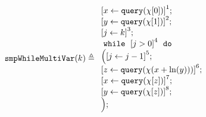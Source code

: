 %
                    \begin{example}
                        \[
                        \kw{smpWhileMultiVar}(k) \triangleq
                        \begin{array}{l}
                            \clabel{ \assign{x}{\query(\chi[0])}}^{1} ; \\
                            \clabel{ \assign{y}{\query(\chi[1])}}^{2} ; \\
                            \clabel{\assign{j}{k} }^{3} ; \\
                                \ewhile ~ \clabel{j > 0}^{4} ~ \edo ~ \\
                                \Big(
                                 \clabel{\assign{j}{j-1}}^{5} ;\\
                                 \clabel{\assign{z}{\query(\chi(x + \ln(y)))} }^{6}  ; \\
                                 \clabel{ \assign{x}{\query(\chi[z])}}^{7} ; \\
                                 \clabel{ \assign{y}{\query(\chi[z])}}^{8} ; \\
                                \Big);
                            \end{array}
                        \]
                        \end{example}
